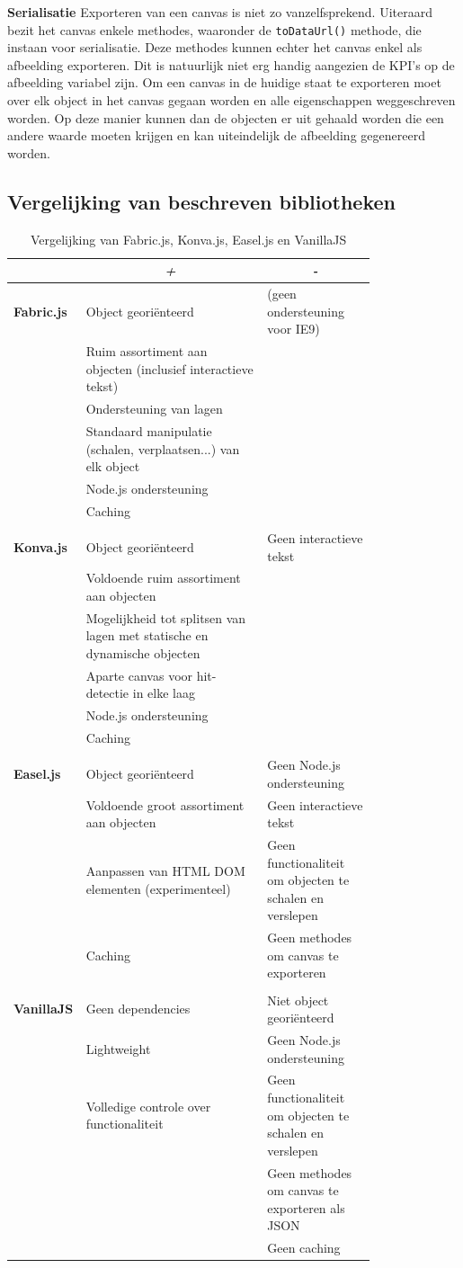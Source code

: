 \textbf{Serialisatie} \break
Exporteren van een canvas is niet zo vanzelfsprekend. Uiteraard bezit het canvas enkele methodes, waaronder de \texttt{toDataUrl()} methode, die instaan voor serialisatie. Deze methodes kunnen echter het canvas enkel als afbeelding exporteren. Dit is natuurlijk niet erg handig aangezien de KPI's op de afbeelding variabel zijn. Om een canvas in de huidige staat te exporteren moet over elk object in het canvas gegaan worden en alle eigenschappen weggeschreven worden. Op deze manier kunnen dan de objecten er uit gehaald worden die een andere waarde moeten krijgen en kan uiteindelijk de afbeelding gegenereerd worden. 

\subsection{Vergelijking van beschreven bibliotheken} \label{vergelijkingBibliotheken}

\begin{table}[htbp]
	\centering
	\begin{tabular}{|l|p{0.5\linewidth}|p{0.3\linewidth}|}
		\hline
		 &
		\multicolumn{1}{|c|}{\textit{\textbf{+}}} & \multicolumn{1}{c|}{\textit{\textbf{-}}}                                                   \tabularnewline \hline
		\textbf{Fabric.js} & Object geori\"{e}nteerd & (geen ondersteuning voor IE9)\tabularnewline
		&Ruim assortiment aan objecten (inclusief interactieve tekst)&\tabularnewline 
		&Ondersteuning van lagen&\tabularnewline 
		&Standaard manipulatie (schalen, verplaatsen...) van elk object&\tabularnewline 
		&Node.js ondersteuning&\tabularnewline 
		&Caching&\tabularnewline 
		&&\tabularnewline 
		\textbf{Konva.js}&Object geori\"{e}nteerd & Geen interactieve tekst\tabularnewline 
		&Voldoende ruim assortiment aan objecten&\tabularnewline 
		&Mogelijkheid tot splitsen van lagen met statische en dynamische objecten&\tabularnewline 
		&Aparte canvas voor hit-detectie in elke laag&\tabularnewline 
		&Node.js ondersteuning&\tabularnewline 
		&Caching&\tabularnewline 
		&&\tabularnewline 
		\textbf{Easel.js}&Object geori\"{e}nteerd&Geen Node.js ondersteuning\tabularnewline 
		&Voldoende groot assortiment aan objecten&Geen interactieve tekst\tabularnewline 
		&Aanpassen van HTML DOM elementen (experimenteel)&Geen functionaliteit om objecten te schalen en verslepen\tabularnewline 
		&Caching&Geen methodes om canvas te exporteren\tabularnewline 
		&&\tabularnewline 
		\textbf{VanillaJS}&Geen dependencies&Niet object geori\"{e}nteerd\tabularnewline 
		&Lightweight&Geen Node.js ondersteuning\tabularnewline 		
		&Volledige controle over functionaliteit&Geen functionaliteit om objecten te schalen en verslepen\tabularnewline 
		&&Geen methodes om canvas te exporteren als JSON\tabularnewline 
		&&Geen caching\tabularnewline 
 \hline
	\end{tabular}
	\caption{Vergelijking van Fabric.js, Konva.js, Easel.js en VanillaJS}
	\label{tabeltextureprofiling}   
\end{table}


